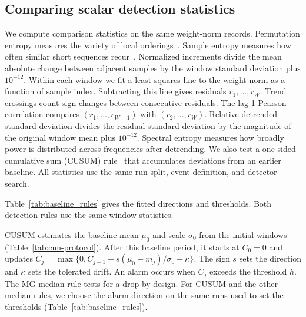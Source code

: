 {\subsection[Comparing scalar detection statistics]{Comparing scalar detection statistics}\label{app:baselines}
We compute comparison statistics on the same weight-norm records. Permutation entropy measures the variety of local orderings~\citep{bandt2002permutation}. Sample entropy measures how often similar short sequences recur~\citep{richman2000physiological}. Normalized increments divide the mean absolute change between adjacent samples by the window standard deviation plus $10^{-12}$. Within each window we fit a least-squares line to the weight norm as a function of sample index. Subtracting this line gives residuals $r_1,\ldots,r_W$. Trend crossings count sign changes between consecutive residuals. The lag-1 Pearson correlation compares $(r_1,\ldots,r_{W-1})$ with $(r_2,\ldots,r_W)$. Relative detrended standard deviation divides the residual standard deviation by the magnitude of the original window mean plus $10^{-12}$. Spectral entropy measures how broadly power is distributed across frequencies after detrending. We also test a one-sided cumulative sum (CUSUM) rule~\citep{page1954continuous} that accumulates deviations from an earlier baseline. All statistics use the same run split, event definition, and detector search.


\begin{table}[!htbp]
\centering\small
\caption{Detection of strong interventions in the CIFAR-10 classifier. Delay is the median number of updates among detections.}
\label{tab:detectors}
\scriptsize\setlength{\tabcolsep}{2pt}

\end{table}

\begin{table}[!htbp]
\centering\small
\caption{False alarms by comparison condition.}
\label{tab:baseline_references}
\scriptsize\setlength{\tabcolsep}{2pt}

\end{table}

Table~\ref{tab:baseline_rules} gives the fitted directions and thresholds. Both detection rules use the same window statistics.

CUSUM estimates the baseline mean $\mu_0$ and scale $\sigma_0$ from the initial windows (Table~\ref{tab:cnn-protocol}). After this baseline period, it starts at $C_0=0$ and updates $C_j=\max\{0,C_{j-1}+s(\mu_0-m_j)/\sigma_0-\kappa\}$. The sign $s$ sets the direction and $\kappa$ sets the tolerated drift. An alarm occurs when $C_j$ exceeds the threshold $h$. The MG median rule tests for a drop by design. For CUSUM and the other median rules, we choose the alarm direction on the same runs used to set the thresholds (Table~\ref{tab:baseline_rules}).

}
